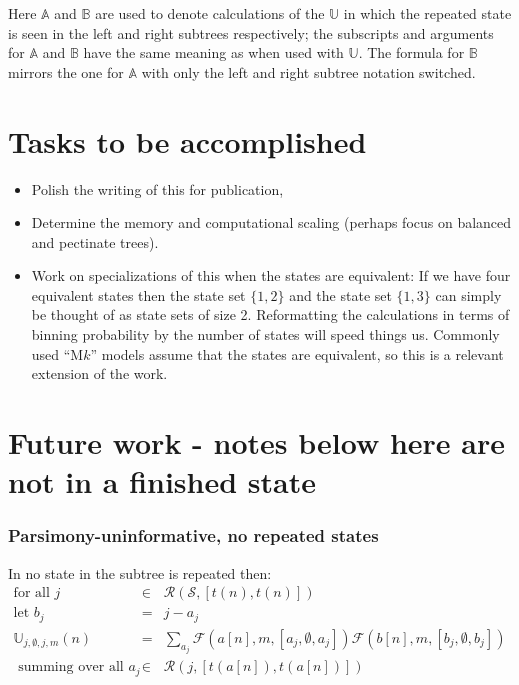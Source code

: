 \documentclass[11pt]{article}
\newcommand{\allStates}{\ensuremath{\mathcal S}\xspace}
\newcommand{\probUninformPatClassSym}{\ensuremath{\mathbb U}\xspace}
\newcommand{\probUninformPatClass}[5]{\ensuremath{\probUninformPatClassSym_{#1,#2,#3,#4}\left(#5\right)}\xspace}
\newcommand{\leftChild}[1]{\ensuremath{a\left[#1\right]}\xspace} %
\newcommand{\rightChild}[1]{\ensuremath{b\left[#1\right]}\xspace}%
\newcommand{\numLeaves}[1]{\ensuremath{t\left(#1\right)}\xspace}
\newcommand{\subsetsOfSizeSet}[3]{\ensuremath{\mathcal R}\left(#1,\left[#2,#3\right]\right)\xspace}
\newcommand{\FelsensteinPruneSym}{{\mathcal{F}}}
\newcommand{\FelsensteinPruneUninform}[5]{\FelsensteinPruneSym(#1,#2,\left[#3,#4,#5\right])}
\begin{document}
Here ${\mathbb A}$ and ${\mathbb B}$ are used to denote calculations of the $\probUninformPatClassSym$ in which the repeated state is seen in the left and right subtrees respectively; the subscripts and arguments for ${\mathbb A}$ and ${\mathbb B}$ have the same meaning as when used with $\probUninformPatClassSym$.
The formula for ${\mathbb B}$ mirrors the one for ${\mathbb A}$ with only the left and right subtree notation switched.

\section{Tasks to be accomplished}
\begin{itemize}
	\item Polish the writing of this for publication,
	\item Determine the memory and computational scaling (perhaps focus on balanced and pectinate trees).
	\item Work on specializations of this when the states are equivalent: If we have four equivalent states then the state set $\{1,2\}$ and the state set $\{1,3\}$ can simply be thought of as state sets of size 2. Reformatting the calculations in terms of binning probability by the number of states will speed things us.  Commonly used ``M$k$'' models assume that the states are equivalent, so this is a relevant extension of the work.
\end{itemize}















\section{{\color{red}Future work - notes below here are not in a finished state}}
\subsubsection{Parsimony-uninformative, no repeated states}
In no state in the subtree is repeated then:
\begin{eqnarray*}
\mbox{for all } j & \in & \subsetsOfSizeSet{\allStates}{\numLeaves{n}}{\numLeaves{n}}\\
\mbox{let } b_j & = & j - a_j \\
\probUninformPatClass{j}{\emptyset}{j}{m}{n} &= & \sum_{a_j}\FelsensteinPruneUninform{\leftChild{n}}{m}{a_j}{\emptyset}{a_j} \FelsensteinPruneUninform{\rightChild{n}}{m}{b_j}{\emptyset}{b_j}\\
\mbox{ summing over all } a_j & \in & \subsetsOfSizeSet{j}{\numLeaves{\leftChild{n}}}{\numLeaves{\leftChild{n}}} \\
\end{eqnarray*}
\end{document}
